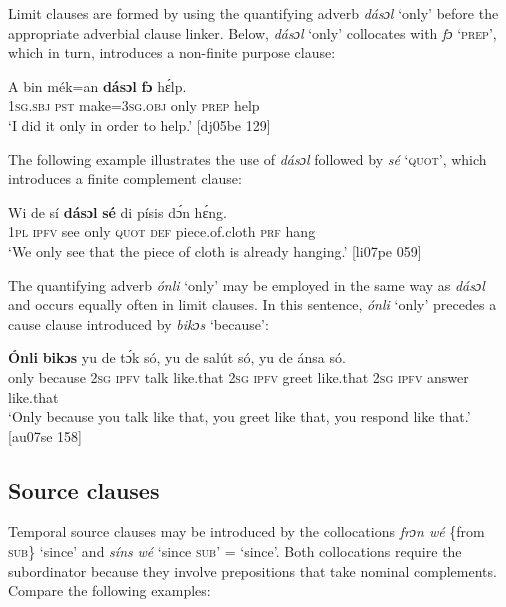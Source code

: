 Limit clauses are formed by using the quantifying adverb \textit{dásɔl} ‘only’ before the appropriate adverbial clause linker. Below, \textit{dásɔl} ‘only’ collocates with \textit{fɔ} ‘\textsc{prep}’, which in turn, introduces a non-finite purpose clause: 


\ea%
    \label{ex:key:1514}
    \gll A    bin  mék=an    \textbf{dásɔl}  \textbf{fɔ}  hɛ́lp.\\
\textsc{1sg.sbj}  \textsc{pst}  make=\textsc{3sg.obj}  only    \textsc{prep}  help\\

\glt ‘I did it only in order to help.’ [dj05be 129]
\z

The following example illustrates the use of \textit{dásɔl} followed by \textit{sé} ‘\textsc{quot}’, which introduces a finite complement clause: 


\ea%
    \label{ex:key:1515}
    \gll Wi  de  sí  \textbf{dásɔl}  \textbf{sé}    di  písis        dɔ́n  hɛ́ng.\\
\textsc{1pl}  \textsc{ipfv}  see  only    \textsc{quot}    \textsc{def}  piece.of.cloth    \textsc{prf}  hang\\

\glt ‘We only see that the piece of cloth is already hanging.’ [li07pe 059]
\z

The quantifying adverb \textit{ónli} ‘only’ may be employed in the same way as \textit{dásɔl} and occurs equally often in limit clauses. In this sentence, \textit{ónli} ‘only’ precedes a cause clause introduced by \textit{bikɔs} ‘because’: 


\ea%
    \label{ex:key:1516}
    \gll \textbf{\'{O}nli}    \textbf{bikɔs}  yu  de  tɔ́k  só,    yu  de  salút  só,
yu  de  ánsa    só.\\
only    because  \textsc{2sg}  \textsc{ipfv}  talk  like.that  \textsc{2sg}  \textsc{ipfv}  greet  like.that
\textsc{2sg}  \textsc{ipfv}  answer  like.that \\

\glt ‘Only because you talk like that, you greet like that, you respond like that.’ [au07se 158]
\z

\subsection{Source clauses}\label{sec:10.7.10}

Temporal source clauses may be introduced by the collocations \textit{frɔn wé} \{from \textsc{sub}\} ‘since’ and \textit{síns} \textit{wé} ‘since \textsc{sub’} = ‘since’. Both collocations require the subordinator because they involve prepositions that take nominal complements. Compare the following examples:


